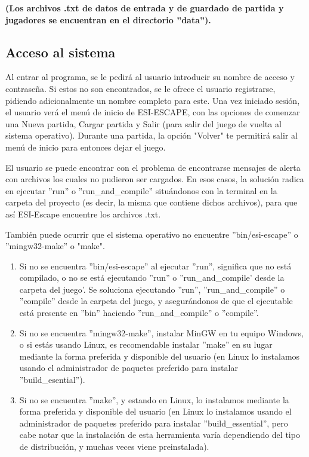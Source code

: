 \bigskip

\textbf{(Los archivos .txt de datos de entrada y de guardado de partida y jugadores se encuentran en el directorio ''data'').}

\subsection{Acceso al sistema}

Al entrar al programa, se le pedirá al usuario introducir su nombre de acceso y contraseña. Si estos no son encontrados, se le ofrece el usuario registrarse, pidiendo adicionalmente un nombre completo para este. Una vez iniciado sesión, el usuario verá el menú de inicio de ESI-ESCAPE, con las opciones de comenzar una Nueva partida, Cargar partida y Salir (para salir del juego de vuelta al sistema operativo). Durante una partida, la opción "Volver" te permitirá salir al menú de inicio para entonces dejar el juego.

\bigskip

El usuario se puede encontrar con el problema de encontrarse mensajes de alerta con archivos los cuales no pudieron ser cargados. En esos casos, la solución radica en ejecutar ''run'' o ''run\_and\_compile'' situándonos con la terminal en la carpeta del proyecto (es decir, la misma que contiene dichos archivos), para que así ESI-Escape encuentre los archivos .txt.

\bigskip

También puede ocurrir que el sistema operativo no encuentre ''bin/esi-escape'' o ''mingw32-make'' o "make".
\begin{enumerate}
	\item Si no se encuentra ''bin/esi-escape'' al ejecutar ''run'', significa que no está compilado, o no se está ejecutando ''run'' o ''run\_and\_compile' desde la carpeta del juego'. Se soluciona ejecutando ''run'', ''run\_and\_compile'' o ''compile'' desde la carpeta del juego, y asegurándonos de que el ejecutable está presente en ''bin'' haciendo ''run\_and\_compile'' o ''compile''.
	\item Si no se encuentra ''mingw32-make'', instalar MinGW en tu equipo Windows, o si estás usando Linux, es recomendable instalar ''make'' en su lugar mediante la forma preferida y disponible del usuario (en Linux lo instalamos usando el administrador de paquetes preferido para instalar ''build\_esential'').
	\item Si no se encuentra ''make'', y estando en Linux, lo instalamos mediante la forma preferida y disponible del usuario (en Linux lo instalamos usando el administrador de paquetes preferido para instalar ''build\_essential'', pero cabe notar que la instalación de esta herramienta varía dependiendo del tipo de distribución, y muchas veces viene preinstalada).
\end{enumerate}

